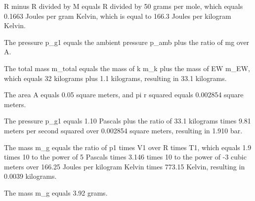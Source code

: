 R minus R divided by M equals R divided by 50 grams per mole, which equals 0.1663 Joules per gram Kelvin, which is equal to 166.3 Joules per kilogram Kelvin.

The pressure p_g1 equals the ambient pressure p_amb plus the ratio of mg over A.

The total mass m_total equals the mass of k m_k plus the mass of EW m_EW, which equals 32 kilograms plus 1.1 kilograms, resulting in 33.1 kilograms.

The area A equals 0.05 square meters, and pi r squared equals 0.002854 square meters.

The pressure p_g1 equals 1.10 Pascals plus the ratio of 33.1 kilograms times 9.81 meters per second squared over 0.002854 square meters, resulting in 1.910 bar.

The mass m_g equals the ratio of p1 times V1 over R times T1, which equals 1.9 times 10 to the power of 5 Pascals times 3.146 times 10 to the power of -3 cubic meters over 166.25 Joules per kilogram Kelvin times 773.15 Kelvin, resulting in 0.0039 kilograms.

The mass m_g equals 3.92 grams.